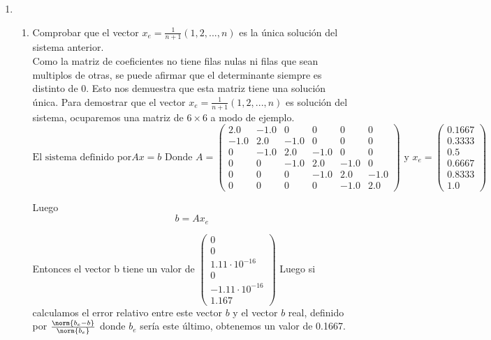 \documentclass{udpreport}
\begin{document}
\begin{enumerate}
	\item
 		\begin{enumerate}
			\item Comprobar que el vector $x_{e} = \frac{1}{n+1}(1, 2, . . . , n)$  es la única solución del sistema anterior.\\
			Como la matriz de coeficientes no tiene filas nulas ni filas que sean multiplos de otras, se puede afirmar que el determinante siempre es distinto de 0. Esto nos demuestra que esta matriz tiene una solución única. Para demostrar que el vector $x_{e} = \frac{1}{n+1}(1,2,...,n)$ es solución del sistema, ocuparemos una matriz de $6 \times 6$ a modo de ejemplo.
			\begin{equation}
				\textrm{El sistema definido por} Ax = b
				\textrm{ Donde } A = \left(\begin{array}{cccccc} 2.0 & -1.0 & 0 & 0 & 0 & 0\\ -1.0 & 2.0 & -1.0 & 0 & 0 & 0\\ 0 & -1.0 & 2.0 & -1.0 & 0 & 0\\ 0 & 0 & -1.0 & 2.0 & -1.0 & 0\\ 0 & 0 & 0 & -1.0 & 2.0 & -1.0\\ 0 & 0 & 0 & 0 & -1.0 & 2.0 \end{array}\right)
				\textrm{ y } x_{e} = \left(\begin{array}{c} 0.1667\\ 0.3333\\ 0.5\\ 0.6667\\ 0.8333\\ 1.0 \end{array}\right)
			\end{equation}			 
			
			Luego 
			\begin{equation}
				b = Ax_{e}
			\end{equation}
			
			Entonces el vector b tiene un valor de $\left(\begin{array}{c} 0\\ 0\\ 1.11\cdot 10^{-16}\\ 0\\ -1.11\cdot 10^{-16}\\ 1.167 \end{array}\right)$
			Luego si calculamos el error relativo entre este vector $b$ y el vector $b$ real, definido por $\frac{\norm{b_{e}-b}}{\norm{b_{e}}}$ donde $b_{e}$ sería este último, obtenemos un valor de 0.1667. 
			

\end{enumerate}
\end{enumerate}
\end{document}

